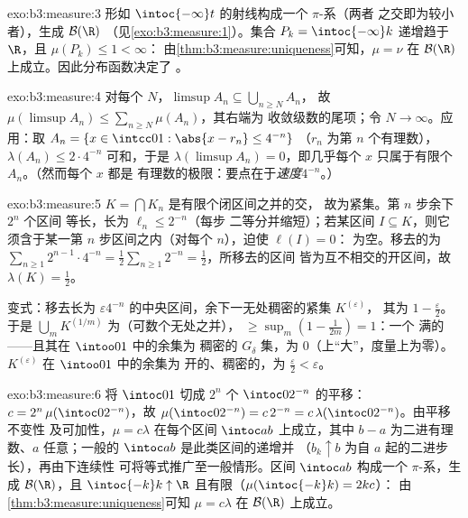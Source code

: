 \begin{solution}{exo:b3:measure:3}
形如 $\intoc{-\infty}t$ 的射线构成一个 $\pi$-系（两者
之交即为较小者），生成 $\mathcal B(\R)$
（见\cref{exo:b3:measure:1}）。集合 $P_k = \intoc{-\infty}k$
递增趋于 $\R$，且 $\mu(P_k) \leq 1 < \infty$：
由\cref{thm:b3:measure:uniqueness}可知，$\mu = \nu$ 在
$\mathcal B(\R)$ 上成立。因此分布函数决定了
。
\end{solution}

\begin{solution}{exo:b3:measure:4}
对每个 $N$，$\limsup A_n \subseteq \bigcup_{n \geq N}A_n$，
故 $\mu(\limsup A_n) \leq \sum_{n\geq N}\mu(A_n)$，其右端为
收敛级数的尾项；令 $N \to \infty$。应用：取
$A_n = \{x \in \intcc01 : \abs{x - r_n} \leq 4^{-n}\}$
（$r_n$ 为第 $n$ 个有理数），$\lambda(A_n) \leq 2\cdot4^{-n}$
可和，于是 $\lambda(\limsup A_n) = 0$，即几乎每个 $x$
只属于有限个 $A_n$。（然而每个 $x$ 都是
有理数的极限：要点在于\emph{速度}$4^{-n}$。）
\end{solution}

\begin{solution}{exo:b3:measure:5}
$K = \bigcap K_n$ 是有限个闭区间之并的交，
故为紧集。第 $n$ 步余下 $2^n$ 个区间
等长，长为 $\ell_n \leq 2^{-n}$（每步
二等分并缩短）；若某区间 $I \subseteq K$，则它
须含于某一第 $n$ 步区间之内（对每个 $n$），迫使 $\ell(I) = 0$：
为空。移去的为 $\sum_{n\geq1}2^{n-1}\cdot
4^{-n} = \frac12\sum_{n\geq1}2^{-n} = \frac12$，所移去的区间
皆为互不相交的开区间，故 $\lambda(K) = \frac12$。

变式：移去长为 $\varepsilon
4^{-n}$ 的中央区间，余下一无处稠密的紧集 $K^{(\varepsilon)}$，
其为 $1 - \frac\varepsilon2$。于是 $\bigcup_m
K^{(1/m)}$ 为（可数个无处之并），
 $\geq \sup_m(1 - \frac1{2m}) = 1$：一个
满的——且其在 $\intoo01$ 中的余集为
稠密的 $G_\delta$ 集，为 $0$（上“大”，度量上为零）。
$K^{(\varepsilon)}$ 在 $\intoo01$ 中的余集为
开的、稠密的，为 $\frac\varepsilon2 < \varepsilon$。
\end{solution}

\begin{solution}{exo:b3:measure:6}
将 $\intoc01$ 切成 $2^n$ 个 $\intoc0{2^{-n}}$ 的平移：
$c = 2^n\,\mu(\intoc0{2^{-n}})$，故 $\mu(\intoc0{2^{-n}}) =
c\,2^{-n} = c\,\lambda(\intoc0{2^{-n}})$。由平移不变性
及可加性，$\mu = c\lambda$ 在每个区间
$\intoc ab$ 上成立，其中 $b - a$ 为二进有理数、$a$ 任意；一般的
$\intoc ab$ 是此类区间的递增并
（$b_k \uparrow b$ 为自 $a$ 起的二进步长），再由下连续性
可将等式推广至一般情形。区间 $\intoc ab$ 构成一个
$\pi$-系，生成 $\mathcal B(\R)$，且 $\intoc{-k}k
\uparrow \R$ 且有限（$\mu(\intoc{-k}k) = 2kc$）：
由\cref{thm:b3:measure:uniqueness}可知 $\mu = c\lambda$ 在
$\mathcal B(\R)$ 上成立。
\end{solution}

